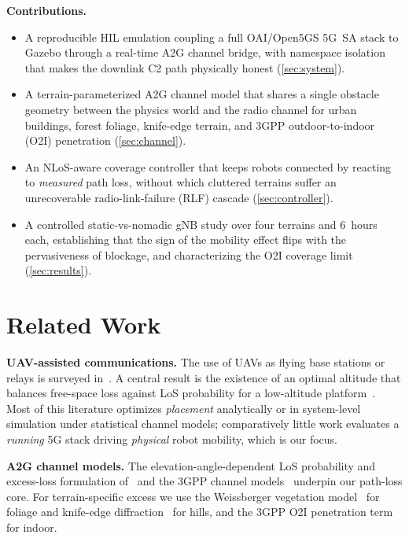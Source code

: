 \documentclass[conference]{IEEEtran}
\begin{document}
\noindent\textbf{Contributions.}
\begin{itemize}
  \item A reproducible HIL emulation coupling a full OAI/Open5GS 5G~SA stack to
  Gazebo through a real-time A2G channel bridge, with namespace isolation that
  makes the downlink C2 path physically honest (\cref{sec:system}).
  \item A terrain-parameterized A2G channel model that shares a single obstacle
  geometry between the physics world and the radio channel for urban buildings,
  forest foliage, knife-edge terrain, and 3GPP outdoor-to-indoor (O2I)
  penetration (\cref{sec:channel}).
  \item An NLoS-aware coverage controller that keeps robots connected by reacting
  to \emph{measured} path loss, without which cluttered terrains suffer an
  unrecoverable radio-link-failure (RLF) cascade (\cref{sec:controller}).
  \item A controlled static-vs-nomadic gNB study over four terrains and 6~hours
  each, establishing that the sign of the mobility effect flips with the
  pervasiveness of blockage, and characterizing the O2I coverage limit
  (\cref{sec:results}).
\end{itemize}

\section{Related Work}
\label{sec:related}
\textbf{UAV-assisted communications.} The use of UAVs as flying base stations or
relays is surveyed in~\cite{zeng2016wireless,mozaffari2019tutorial}. A central
result is the existence of an optimal altitude that balances free-space loss
against LoS probability for a low-altitude platform~\cite{alhourani2014optimal}.
Most of this literature optimizes \emph{placement} analytically or in
system-level simulation under statistical channel models; comparatively little
work evaluates a \emph{running} 5G stack driving \emph{physical} robot mobility,
which is our focus.

\textbf{A2G channel models.} The elevation-angle-dependent LoS probability
and excess-loss formulation of~\cite{alhourani2014optimal} and the 3GPP channel
models~\cite{3gpp38901,3gpp36777} underpin our path-loss core. For terrain-specific
excess we use the Weissberger vegetation model~\cite{weissberger1982} for foliage
and knife-edge diffraction~\cite{ituP526} for hills, and the 3GPP O2I penetration
term~\cite{3gpp38901} for indoor.
\end{document}
